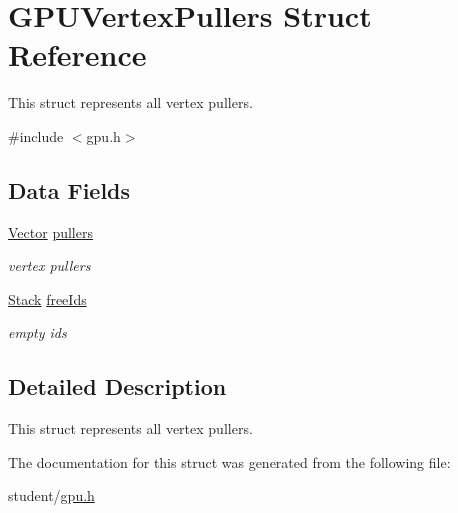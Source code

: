 \hypertarget{structGPUVertexPullers}{}\section{G\+P\+U\+Vertex\+Pullers Struct Reference}
\label{structGPUVertexPullers}


This struct represents all vertex pullers.  




{\ttfamily \#include $<$gpu.\+h$>$}

\subsection*{Data Fields}
\begin{DoxyCompactItemize}
\item 
\mbox{\label{structGPUVertexPullers_aebb98d9d41cb7c160972337cb8805ce8}} 
\hyperlink{structVector}{Vector} \hyperlink{structGPUVertexPullers_aebb98d9d41cb7c160972337cb8805ce8}{pullers}
\begin{DoxyCompactList}\small\item\em vertex pullers \end{DoxyCompactList}\item 
\mbox{\label{structGPUVertexPullers_a8f017330a2c576127f365c223872322a}} 
\hyperlink{structStack}{Stack} \hyperlink{structGPUVertexPullers_a8f017330a2c576127f365c223872322a}{free\+Ids}
\begin{DoxyCompactList}\small\item\em empty ids \end{DoxyCompactList}\end{DoxyCompactItemize}


\subsection{Detailed Description}
This struct represents all vertex pullers. 

The documentation for this struct was generated from the following file\+:\begin{DoxyCompactItemize}
\item 
student/\hyperlink{gpu_8h}{gpu.\+h}\end{DoxyCompactItemize}
